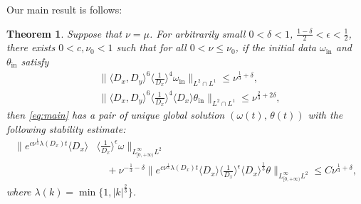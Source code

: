 \documentclass[reqno, 12pt]{amsart} %
\theoremstyle{plain} %
\newtheorem{Thm}{Theorem}[section] %
\theoremstyle{definition}
\theoremstyle{remark}
\numberwithin{equation}{section} %
\begin{document}
    Our main result is follows: 
    \begin{Thm} \label{thm:main}
		Suppose that $\nu=\mu$. For arbitrarily small $0<\delta<1$, $\frac{1-\delta}{2}<\epsilon<\frac{1}{2}$, there exists $0<c, \nu_0<1$ such that for all $0<\nu \leq \nu_0$, if the initial data $\omega_{\mathrm{in}}$ and $\theta_{\mathrm{in}}$ satisfy
		\begin{equation}\begin{aligned} \label{eq:the initial data}
				&\|\langle D_x, D_y\rangle^6\langle\frac{1}{D_x}\rangle^4 \omega_{\mathrm{in}}\|_{L^2\cap L^1} \leq \nu^{\frac{1}{3}+\delta},  \\
				&\|\langle D_x, D_y\rangle^6\langle\frac{1}{D_x}\rangle^4 \langle D_x \rangle \theta_{\mathrm{in}}\|_{L^2\cap L^1} \leq \nu^{\frac{2}{3} + 2\delta},
		\end{aligned}\end{equation}
		then \eqref{eq:main} has a pair of unique global solution $(\omega(t),\,\theta(t))$ with the following stability estimate:
		\begin{equation*}\begin{aligned}
				\| e^{c \nu^{\frac{1}{3}}  \lambda(D_x) t} \langle D_x \rangle &\langle \tfrac{1}{D_x}  \rangle^\epsilon \omega\|_{L^\infty_{[0, +\infty)} L^2}  \\
				&\quad + \nu^{-\frac{1}{3} - \delta} \| e^{c \nu^{\frac{1}{3}} \lambda(D_x) t} \langle D_x \rangle \langle \tfrac{1}{D_x} \rangle^\epsilon \langle D_x \rangle^{\frac{1}{3}} \theta \|_{L^\infty_{[0, +\infty)} L^2} 
				\leq  C \nu^{\frac{1}{3} +\delta},
		\end{aligned}\end{equation*}
		where $\lambda(k)=\min \{1,|k|^{\frac{2}{3}} \}$.
	\end{Thm}
\end{document}
